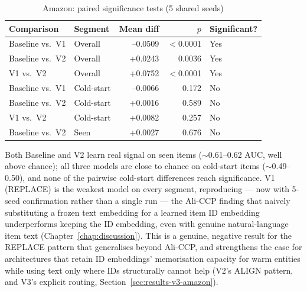 \documentclass{uclthesis}
\begin{document}
\begin{table}[h]
\centering
\caption{Amazon: paired significance tests (5 shared seeds)}
\label{tab:amazon-sig}
\begin{tabular}{llrrl}
\toprule
Comparison & Segment & Mean diff & $p$ & Significant? \\
\midrule
Baseline vs.\ V1 & Overall\footnotemark & --0.0509 & $<$0.0001 & Yes \\
Baseline vs.\ V2 & Overall\footnotemark & +0.0243 & 0.0036 & Yes \\
V1 vs.\ V2       & Overall\footnotemark & +0.0752 & $<$0.0001 & Yes \\
Baseline vs.\ V1 & Cold-start & --0.0066 & 0.172 & No \\
Baseline vs.\ V2 & Cold-start & +0.0016 & 0.589 & No \\
V1 vs.\ V2       & Cold-start & +0.0082 & 0.257 & No \\
Baseline vs.\ V2 & Seen & +0.0027 & 0.676 & No \\
\bottomrule
\end{tabular}
\end{table}

Both Baseline and V2 learn real signal on seen items ($\sim$0.61--0.62 AUC, well above chance); all three models are close to chance on cold-start items ($\sim$0.49--0.50), and none of the pairwise cold-start differences reach significance. V1 (REPLACE) is the weakest model on every segment, reproducing --- now with 5-seed confirmation rather than a single run --- the Ali-CCP finding that naively substituting a frozen text embedding for a learned item ID embedding underperforms keeping the ID embedding, even with genuine natural-language item text (Chapter~\ref{chap:discussion}). This is a genuine, negative result for the REPLACE pattern that generalises beyond Ali-CCP, and strengthens the case for architectures that retain ID embeddings' memorisation capacity for warm entities while using text only where IDs structurally cannot help (V2's ALIGN pattern, and V3's explicit routing, Section~\ref{sec:results-v3-amazon}).
\end{document}
